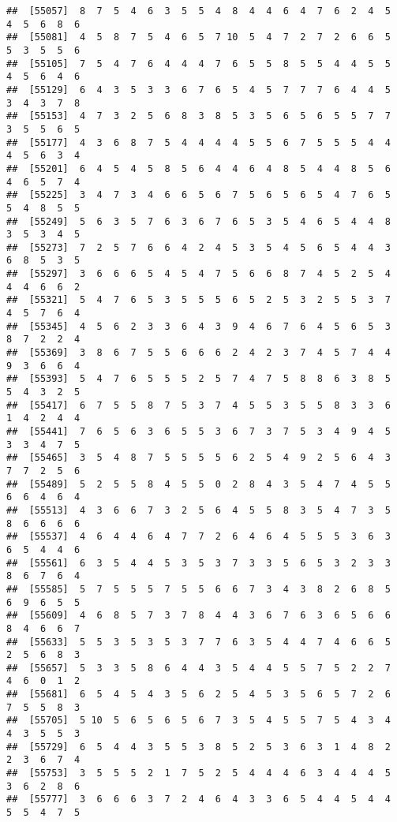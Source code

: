 \documentclass[
]{book}
\begin{document}
\begin{verbatim}
##  [55057]  8  7  5  4  6  3  5  5  4  8  4  4  6  4  7  6  2  4  5  4  5  6  8  6
##  [55081]  4  5  8  7  5  4  6  5  7 10  5  4  7  2  7  2  6  6  5  5  3  5  5  6
##  [55105]  7  5  4  7  6  4  4  4  7  6  5  5  8  5  5  4  4  5  5  4  5  6  4  6
##  [55129]  6  4  3  5  3  3  6  7  6  5  4  5  7  7  7  6  4  4  5  3  4  3  7  8
##  [55153]  4  7  3  2  5  6  8  3  8  5  3  5  6  5  6  5  5  7  7  3  5  5  6  5
##  [55177]  4  3  6  8  7  5  4  4  4  4  5  5  6  7  5  5  5  4  4  4  5  6  3  4
##  [55201]  6  4  5  4  5  8  5  6  4  4  6  4  8  5  4  4  8  5  6  4  6  5  7  4
##  [55225]  3  4  7  3  4  6  6  5  6  7  5  6  5  6  5  4  7  6  5  5  4  8  5  5
##  [55249]  5  6  3  5  7  6  3  6  7  6  5  3  5  4  6  5  4  4  8  3  5  3  4  5
##  [55273]  7  2  5  7  6  6  4  2  4  5  3  5  4  5  6  5  4  4  3  6  8  5  3  5
##  [55297]  3  6  6  6  5  4  5  4  7  5  6  6  8  7  4  5  2  5  4  4  4  6  6  2
##  [55321]  5  4  7  6  5  3  5  5  5  6  5  2  5  3  2  5  5  3  7  4  5  7  6  4
##  [55345]  4  5  6  2  3  3  6  4  3  9  4  6  7  6  4  5  6  5  3  8  7  2  2  4
##  [55369]  3  8  6  7  5  5  6  6  6  2  4  2  3  7  4  5  7  4  4  9  3  6  6  4
##  [55393]  5  4  7  6  5  5  5  2  5  7  4  7  5  8  8  6  3  8  5  5  4  3  2  5
##  [55417]  6  7  5  5  8  7  5  3  7  4  5  5  3  5  5  8  3  3  6  1  4  2  4  4
##  [55441]  7  6  5  6  3  6  5  5  3  6  7  3  7  5  3  4  9  4  5  3  3  4  7  5
##  [55465]  3  5  4  8  7  5  5  5  5  6  2  5  4  9  2  5  6  4  3  7  7  2  5  6
##  [55489]  5  2  5  5  8  4  5  5  0  2  8  4  3  5  4  7  4  5  5  6  6  4  6  4
##  [55513]  4  3  6  6  7  3  2  5  6  4  5  5  8  3  5  4  7  3  5  8  6  6  6  6
##  [55537]  4  6  4  4  6  4  7  7  2  6  4  6  4  5  5  5  3  6  3  6  5  4  4  6
##  [55561]  6  3  5  4  4  5  3  5  3  7  3  3  5  6  5  3  2  3  3  8  6  7  6  4
##  [55585]  5  7  5  5  5  7  5  5  6  6  7  3  4  3  8  2  6  8  5  6  9  6  5  5
##  [55609]  4  6  8  5  7  3  7  8  4  4  3  6  7  6  3  6  5  6  6  8  4  6  6  7
##  [55633]  5  5  3  5  3  5  3  7  7  6  3  5  4  4  7  4  6  6  5  2  5  6  8  3
##  [55657]  5  3  3  5  8  6  4  4  3  5  4  4  5  5  7  5  2  2  7  4  6  0  1  2
##  [55681]  6  5  4  5  4  3  5  6  2  5  4  5  3  5  6  5  7  2  6  7  5  5  8  3
##  [55705]  5 10  5  6  5  6  5  6  7  3  5  4  5  5  7  5  4  3  4  4  3  5  5  3
##  [55729]  6  5  4  4  3  5  5  3  8  5  2  5  3  6  3  1  4  8  2  2  3  6  7  4
##  [55753]  3  5  5  5  2  1  7  5  2  5  4  4  4  6  3  4  4  4  5  3  6  2  8  6
##  [55777]  3  6  6  6  3  7  2  4  6  4  3  3  6  5  4  4  5  4  4  5  5  4  7  5

\end{verbatim}
\end{document}
